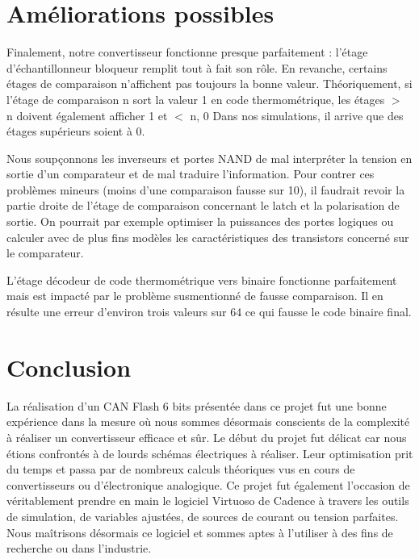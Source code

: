 \documentclass[11pt]{article}
\begin{document}
\section{Am\'eliorations possibles}

Finalement, notre convertisseur fonctionne presque parfaitement : l'\'etage d'\'echantillonneur bloqueur remplit tout \`a fait son r\^ole.
En revanche, certains \'etages de comparaison n'affichent pas toujours la bonne valeur. Th\'eoriquement, si l'\'etage de comparaison n sort
la valeur 1 en code thermom\'etrique, les \'etages $>$ n doivent \'egalement afficher 1 et $<$ n, 0 Dans nos simulations, il arrive que des \'etages
sup\'erieurs soient \`a 0.

Nous soup\c connons les inverseurs et portes NAND de mal interpr\'eter la tension en sortie d'un comparateur et de mal traduire l'information.
Pour contrer ces probl\`emes mineurs (moins d'une comparaison fausse sur 10), il faudrait revoir la partie droite de l'\'etage de comparaison
concernant le latch et la polarisation de sortie. On pourrait par exemple optimiser la puissances des portes logiques ou calculer avec de
plus fins mod\`eles les caract\'eristiques des transistors concern\'e sur le comparateur.

L'\'etage d\'ecodeur de code thermom\'etrique vers binaire fonctionne parfaitement mais est impact\'e par le probl\`eme susmentionn\'e de fausse comparaison.
Il en r\'esulte une erreur d'environ trois valeurs sur 64 ce qui fausse le code binaire final.

\section{Conclusion}

La r\'ealisation d'un CAN Flash 6 bits pr\'esent\'ee dans ce projet fut une bonne exp\'erience dans la mesure o\`u nous sommes d\'esormais conscients
de la complexit\'e \`a r\'ealiser un convertisseur efficace et s\^ur.
Le d\'ebut du projet fut d\'elicat car nous \'etions confront\'es \`a de lourds sch\'emas \'electriques \`a r\'ealiser. Leur optimisation prit du temps et
passa par de nombreux calculs th\'eoriques vus en cours de convertisseurs ou d'\'electronique analogique.
Ce projet fut \'egalement l'occasion de v\'eritablement prendre en main le logiciel Virtuoso de Cadence \`a travers les outils de simulation,
 de variables ajust\'ees, de sources de courant ou tension parfaites. Nous maîtrisons d\'esormais ce logiciel et sommes aptes \`a l'utiliser \`a
 des fins de recherche ou dans l'industrie.
\end{document}
